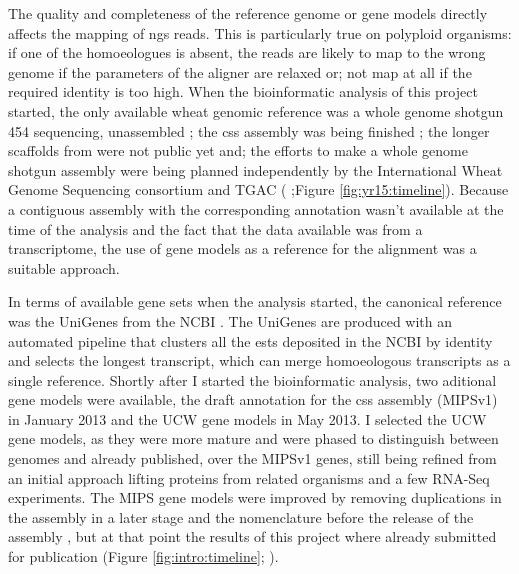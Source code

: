The quality and completeness  of the reference genome or gene models directly affects the mapping of \gls{ngs} reads. 
This is particularly true on polyploid organisms: if one of the homoeologues is absent, the reads are likely to map to the wrong genome if the parameters of the aligner are relaxed or; not map at all if the required identity is too high.
When the bioinformatic analysis of this project started, the only available wheat genomic reference was a whole genome shotgun 454 sequencing, unassembled \citep{Brenchley2012}; the \gls{css} assembly was being finished \citep{Mayer2014}; the longer scaffolds from \citet{Chapman2015} were not public yet and; the efforts to make a whole genome shotgun assembly were being planned independently by the International Wheat Genome Sequencing consortium  \citep{Pozniak2016} and TGAC (\citealt{Clark2016} ;Figure \ref{fig:yr15:timeline}).  
Because a contiguous assembly with the corresponding annotation wasn't available at the time of the analysis and the fact that the data available was from a transcriptome, the use of gene models as a reference for the alignment was a suitable approach. 

In terms of available gene sets when the analysis started, the canonical reference was the UniGenes from the NCBI \citep{PontiusJUWagnerL2002}. 
The UniGenes are produced with an automated pipeline that clusters all the \glspl{est} deposited in the NCBI by identity and selects the longest transcript, which can merge homoeologous transcripts as a single reference.
Shortly after I started the bioinformatic analysis, two aditional gene models were available, the draft annotation for the \gls{css} assembly (MIPSv1) in January 2013 and the UCW gene models \citep{Krasileva2013} in May 2013. 
I selected the UCW gene models, as they were more mature and were phased to distinguish between genomes and already published, over the MIPSv1 genes, still being refined from an initial approach lifting proteins from related organisms and a few RNA-Seq experiments.  
The MIPS gene models were improved by removing duplications in the assembly in a later stage and the nomenclature before the release of the assembly \citep{Mayer2014}, but at that point the results of this project where already submitted for publication (Figure \ref{fig:intro:timeline}; \citealt{Ramirez-Gonzalez2015b}). 
 
